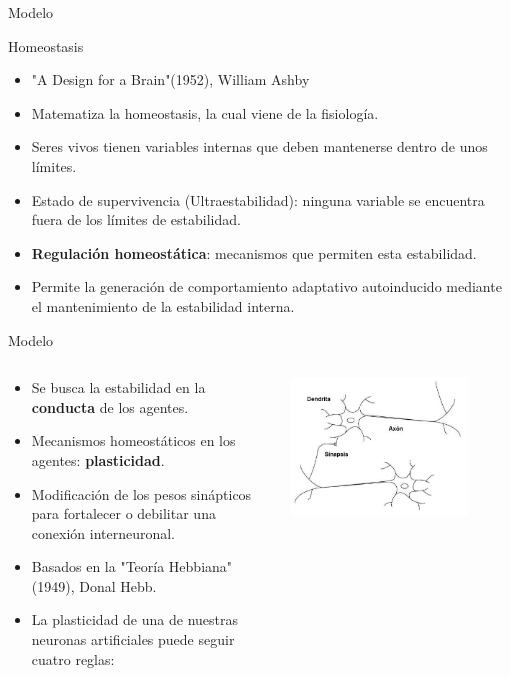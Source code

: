 \documentclass[aspectratio=169]{beamer}
\begin{document}
\begin{frame}{Modelo}
\begin{block}{Homeostasis}
\begin{itemize}
  \item "A Design for a Brain"(1952), William Ashby
  \item Matematiza la homeostasis, la cual viene de la fisiología.
  \item Seres vivos tienen variables internas que deben mantenerse dentro de unos límites.
  \item Estado de supervivencia (Ultraestabilidad): ninguna variable se encuentra fuera de los límites de estabilidad.
  \item \textbf{Regulación homeostática}: mecanismos que permiten esta estabilidad.
  \item Permite la generación de comportamiento adaptativo autoinducido mediante el mantenimiento de la estabilidad interna.
\end{itemize}
\end{block}
\end{frame}

\begin{frame}{Modelo}
  \begin{columns}
    \begin{column}{0.5\textwidth}
        \begin{itemize}
          \item Se busca la estabilidad en la \textbf{conducta} de los agentes.
          \item Mecanismos homeostáticos en los agentes: \textbf{plasticidad}.
          \item Modificación de los pesos sinápticos para fortalecer o debilitar una conexión interneuronal.
          \item Basados en la "Teoría Hebbiana" (1949), Donal Hebb.
          \item La plasticidad de una de nuestras neuronas artificiales puede seguir cuatro reglas:
        \end{itemize}
    \end{column}
    \begin{column}{0.5\textwidth}
      \includegraphics[width=0.8\textwidth,height=.50\textheight]{Imagenes/Neurona}
    \end{column}
  \end{columns}

\end{frame}
\end{document}
